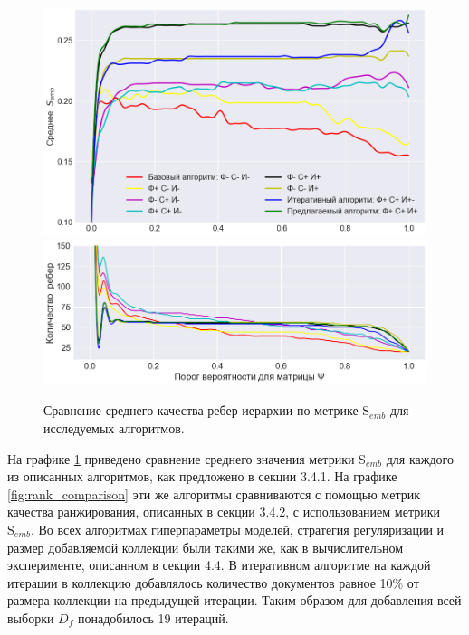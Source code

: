 \begin{figure}[h]
    \centering 
    \includegraphics[width=1\textwidth]{img/alg_comparison.png}
    \includegraphics[width=1\textwidth]{img/num_edges.png}
    \caption{\label{fig:alg_comparison}Сравнение среднего качества ребер иерархии по метрике $\mathrm{S}_{emb}$ для исследуемых алгоритмов.}
\end{figure}

На графике \ref{fig:alg_comparison} приведено сравнение среднего значения метрики $\mathrm{S}_{emb}$ для каждого из описанных алгоритмов, как предложено в секции 3.4.1. На графике \ref{fig:rank_comparison} эти же алгоритмы сравниваются с помощью метрик качества ранжирования, описанных в секции 3.4.2, с использованием метрики $\mathrm{S}_{emb}$. Во всех алгоритмах гиперпараметры моделей, стратегия регуляризации и размер добавляемой коллекции были такими же, как в вычислительном эксперименте, описанном в секции 4.4. В итеративном алгоритме на каждой итерации в коллекцию добавлялось количество документов равное 10\% от размера коллекции на предыдущей итерации. Таким образом для добавления всей выборки $D_f$ понадобилось 19 итераций.

